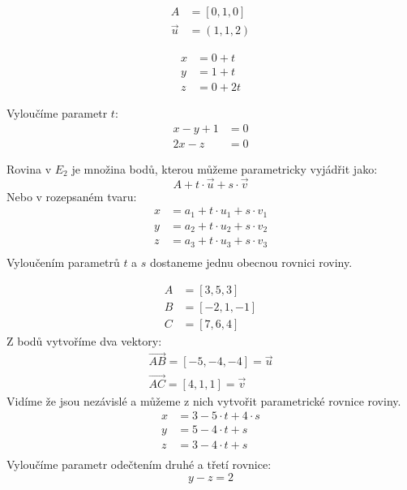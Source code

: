 \begin{example}
    \begin{align*}
        A &= [0, 1, 0]\\
        \vec{u} &= (1, 1, 2)
    \end{align*}

    \begin{align*}
        x &= 0 + t\\
        y &= 1 + t\\
        z &= 0 + 2t
    \end{align*}

    Vyloučíme parametr $t$:
    \begin{align*}
        x -y + 1&= 0\\
        2x -z &=0
    \end{align*}
\end{example}

\begin{definition}[Rovina v $E_3$]
    Rovina v $E_2$ je množina bodů, kterou můžeme parametricky vyjádřit jako:
    $$A + t\cdot \vec{u} + s \cdot \vec{v}$$
    Nebo v rozepsaném tvaru:
    \begin{align*}
        x &= a_1 + t\cdot u_1 + s \cdot v_1\\
        y &= a_2 + t\cdot u_2 + s \cdot v_2\\
        z &= a_3 + t\cdot u_3 + s \cdot v_3\\
    \end{align*}
    Vyloučením parametrů $t$ a $s$ dostaneme jednu obecnou rovnici roviny.
\end{definition}

\begin{example}
    \begin{align*}
        A &= [3, 5, 3]\\
        B &= [-2, 1, -1]\\
        C &= [7, 6, 4]
    \end{align*}
    Z bodů vytvoříme dva vektory:
    \begin{align*}
        \vec{AB} = [-5, -4, -4] = \vec{u}\\
        \vec{AC} = [4, 1, 1] = \vec{v}
    \end{align*}
    Vidíme že jsou nezávislé a můžeme z nich vytvořit parametrické rovnice roviny.
    \begin{align*}
        x &= 3 - 5 \cdot t + 4\cdot s\\
        y &= 5 - 4 \cdot t + s\\
        z &= 3 - 4 \cdot t + s\\
    \end{align*}
    Vyloučíme parametr odečtením druhé a třetí rovnice:
    $$y - z = 2$$
\end{example}

